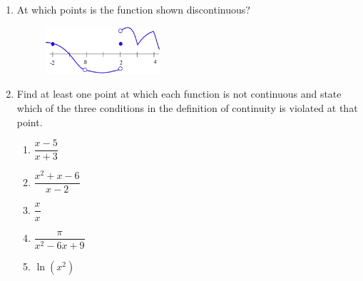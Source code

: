 \begin{example}
\begin{enumerate}
    \item	At which points is the function shown  discontinuous?	

    \begin{figure}[!ht]
    \centering
    \includegraphics[width=0.4\textwidth]{img/chap2/image019.png}
    \end{figure}

    \item	Find at least one point at which each function is not continuous and  state which of the  three  conditions in the definition of continuity is 
	violated at that point.
    \begin{enumerate}[label=(\alph*)]
    \item $\dfrac{x-5}{x+3}$
    \item $\dfrac{x^2 + x -6}{x-2}$
    \item $\dfrac{x}{x}$
    \item $\dfrac{\pi}{x^2-6x+9}$
    \item $\ln(x^2)$
    \end{enumerate}
\end{enumerate}
\end{example}
